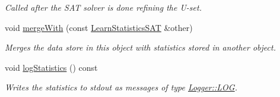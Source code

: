 \begin{DoxyCompactItemize}
\begin{DoxyCompactList}\small\item\em Called after the S\-A\-T solver is done refining the U-\/set. \end{DoxyCompactList}\item 
void \hyperlink{classLearnStatisticsSAT_a4dac4632cddd2726893c5709a556181b}{merge\-With} (const \hyperlink{classLearnStatisticsSAT}{Learn\-Statistics\-S\-A\-T} \&other)
\begin{DoxyCompactList}\small\item\em Merges the data store in this object with statistics stored in another object. \end{DoxyCompactList}\item 
void \hyperlink{classLearnStatisticsSAT_a8c66d3d4b1987b269e598037b689e09a}{log\-Statistics} () const 
\begin{DoxyCompactList}\small\item\em Writes the statistics to stdout as messages of type \hyperlink{classLogger_ac9e601f90bf326ce2088de52018861dca07be7495a7931bee16f5d94b3671f5de}{Logger\-::\-L\-O\-G}. \end{DoxyCompactList}\end{DoxyCompactItemize}
